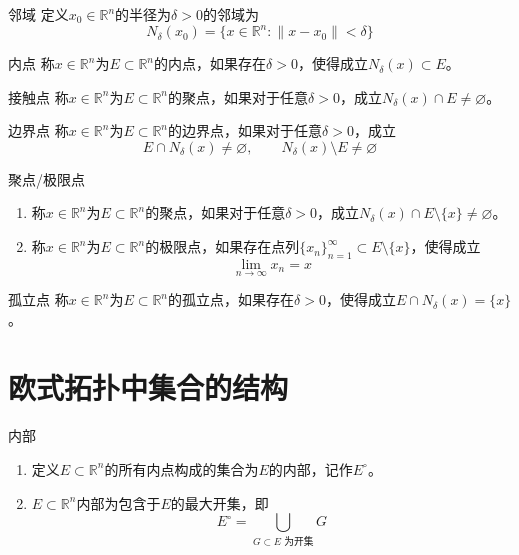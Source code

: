 \documentclass[lang = cn, scheme = chinese, thmcnt = section]{elegantbook}
\newcommand{\R}{\mathbb{R}}            %
\newcommand{\sub}{\subset}             %
\begin{document}
\begin{definition}{邻域}
	定义$x_0\in\R^n$的半径为$\delta>0$的邻域为%
	$$
	N_\delta(x_0)=\{ x\in\R^n:\|x-x_0\|<\delta \}
	$$
\end{definition}

\begin{definition}{内点}
	称$x\in\R^n$为$E\sub\R^n$的内点，如果存在$\delta>0$，使得成立$N_\delta(x)\sub E$。
\end{definition}

\begin{definition}{接触点}
	称$x\in\R^n$为$E\sub\R^n$的聚点，如果对于任意$\delta>0$，成立$N_\delta(x)\cap E \ne\varnothing$。
\end{definition}

\begin{definition}{边界点}
	称$x\in\R^n$为$E\sub\R^n$的边界点，如果对于任意$\delta>0$，成立
	$$
	E\cap N_\delta(x)\ne\varnothing,\qquad 
	N_\delta(x)\setminus E\ne\varnothing
	$$
\end{definition}

\begin{definition}{聚点/极限点}
	\begin{enumerate}
		\item 称$x\in\R^n$为$E\sub\R^n$的聚点，如果对于任意$\delta>0$，成立$N_\delta(x)\cap E\setminus\{x\}\ne\varnothing$。
		\item 称$x\in\R^n$为$E\sub\R^n$的极限点，如果存在点列$\{ x_n \}_{n=1}^{\infty}\sub E\setminus\{x\}$，使得成立
		$$
		\lim_{n\to\infty}{x_n}=x
		$$
	\end{enumerate}
\end{definition}

\begin{definition}{孤立点}
	称$x\in\R^n$为$E\sub\R^n$的孤立点，如果存在$\delta>0$，使得成立$E\cap N_\delta(x)=\{x\}$。
\end{definition}

\section{欧式拓扑中集合的结构}

\begin{definition}{内部}
	\begin{enumerate}
		\item 定义$E\sub\R^n$的所有内点构成的集合为$E$的内部，记作$E^{\circ}$。
		\item $E\sub\R^n$内部为包含于$E$的最大开集，即%
		$$
		E^\circ=\bigcup_{G\sub E\text{ 为开集}}G
		$$
	\end{enumerate}
\end{definition}
\end{document}
